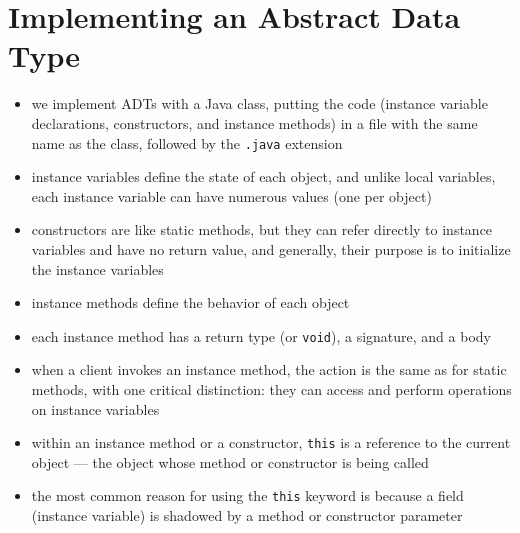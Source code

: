 \documentclass[8pt,a4paper,compress]{beamer}
\begin{document}
\section{Implementing an Abstract Data Type}
\begin{frame}[fragile]
\begin{itemize}
\item we implement ADTs with a Java class, putting the code (instance variable declarations, constructors, and instance methods) in a file with the same name as the class, followed by the \lstinline{.java} extension

\item instance variables define the state of each object, and unlike local variables, each instance variable can have numerous values (one per object)

\item constructors are like static methods, but they can refer directly to instance variables and have no return value, and generally, their purpose is to initialize the instance variables

\item instance methods define the behavior of each object

\item each instance method has a return type (or \lstinline{void}), a signature, and a body

\item when a client invokes an instance method, the action is the same as for static methods, with one critical distinction: they can access
and perform operations on instance variables

\item within an instance method or a constructor, \lstinline{this} is a reference to the current object --- the object whose method or constructor is being called

\item the most common reason for using the \lstinline{this} keyword is because a field (instance variable) is shadowed by a method or constructor parameter
\end{itemize}
\end{frame}
\end{document}
